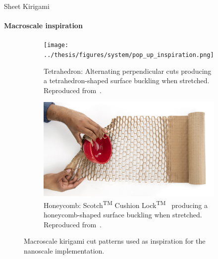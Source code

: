 \documentclass[
	10pt, %
]{beamer}
\begin{document}
\begin{frame}{Sheet Kirigami}
	\framesubtitle{Macroscale inspiration}
	\vspace*{5mm}
	\begin{figure}[H]
		\centering
		\begin{subfigure}[t]{0.48\textwidth}
			\centering
			\texttt{[image: ../thesis/figures/system/pop\_up\_inspiration.png]}
			\caption{Tetrahedron: Alternating perpendicular cuts producing a tetrahedron-shaped surface buckling when stretched. Reproduced from~\cite{new_pop_up}. }
		\end{subfigure}
		\hfill
		\begin{subfigure}[t]{0.48\textwidth}
			\centering
			\includegraphics[width=\textwidth]{../thesis/figures/system/honeycomb_inspiration.jpg}
			\caption{Honeycomb: Scotch\textsuperscript{TM} Cushion Lock\textsuperscript{TM}~\cite{cushion_wrap} producing a honeycomb-shaped surface buckling when stretched. Reproduced from~\cite{cushion_wrap}.}
		\end{subfigure}
		\hfill
		\caption{Macroscale kirigami cut patterns used as inspiration for the nanoscale implementation.}
	  \end{figure}
\end{frame}
%
%
\end{document}
